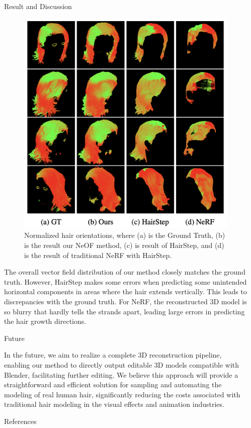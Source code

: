 \documentclass[final]{beamer}
\newlength{\sepwidth}
\newlength{\colwidth}
\newcommand{\separatorcolumn}{\begin{column}{\sepwidth}\end{column}}
\begin{document}
\begin{frame}[t]
\begin{columns}[t]
\begin{column}{\colwidth}
\begin{block}{Result and Discussion}
\begin{figure}[h]
        \includegraphics[width=0.6\linewidth]{poster/4by4.png}
        
        \caption{Normalized hair orientations, where (a) is the Ground Truth, (b) is the result our NeOF method, (c) is result of HairStep, and (d) is the result of traditional NeRF with HairStep.}
        \label{fig:result_grid}
    \end{figure}

    The overall vector field distribution of our method closely matches the ground truth. However, HairStep makes some errors when predicting some unintended horizontal components in areas where the hair extends vertically. This leads to discrepancies with the ground truth. For NeRF, the reconstructed 3D model is so blurry that hardly tells the strands apart, leading large errors in predicting the hair growth directions.

  \end{block}

  \begin{block}{Future}

  In the future, we aim to realize a complete 3D reconstruction pipeline, enabling our method to directly output editable 3D models compatible with Blender, facilitating further editing. We believe this approach will provide a straightforward and efficient solution for sampling and automating the modeling of real human hair, significantly reducing the costs associated with traditional hair modeling in the visual effects and animation industries.

  \end{block}

  \begin{block}{References}

    \nocite{*}
    \footnotesize{}

  \end{block}

\end{column}

\separatorcolumn

\end{columns}

\end{frame}
\end{document}
